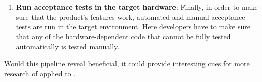 \begin{enumerate}
    \item \textbf{Run acceptance tests in the target hardware}: Finally, in order to make sure that the product's features work, automated and manual acceptance tests are run in the target environment. Here developers have to make sure that any of the hardware-dependent code that cannot be fully tested automatically is tested manually.
\end{enumerate}

Would this pipeline reveal beneficial, it could provide interesting cues for more research of \tdd applied to \ess.